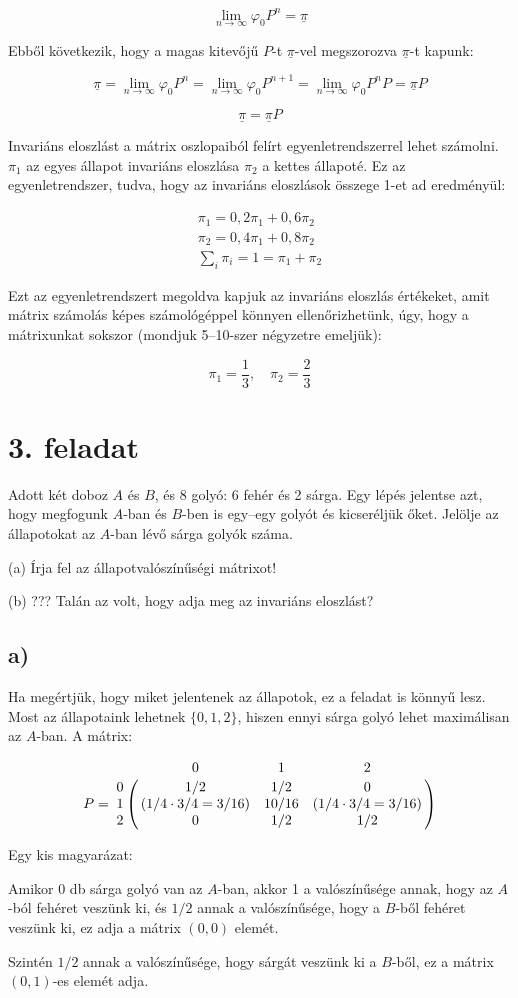 \documentclass[a4paper,12pt]{article}
\begin{document}
\[
\lim_{n\to \infty} \varphi_0 P^n = \underline{\pi}
\] 

Ebből következik, hogy a magas kitevőjű $P$-t $\underline{\pi}$-vel
megszorozva $\underline{\pi}$-t kapunk:

\[
\underline{\pi} = \lim_{n\to \infty} \varphi_0 P^n = 
\lim_{n\to \infty} \varphi_0 P^{n+1} = 
\lim_{n\to \infty} \varphi_0 P^n P = \underline{\pi} P
\]

\[
\underline{\pi} = \underline{\pi} P
\]

Invariáns eloszlást a mátrix oszlopaiból felírt
egyenletrendszerrel lehet számolni. $\pi_1$ az egyes állapot invariáns
eloszlása $\pi_2$ a kettes állapoté. Ez az egyenletrendszer, tudva, hogy 
az invariáns eloszlások összege 1-et ad eredményül:


\begin{eqnarray*}
\pi_1 = 0,2 \pi_1 + 0,6 \pi_2 \\
\pi_2 = 0,4 \pi_1 + 0,8 \pi_2 \\
\sum_i \pi_i = 1 = \pi_1 + \pi_2
\end{eqnarray*}

Ezt az egyenletrendszert megoldva kapjuk az invariáns eloszlás 
értékeket, amit mátrix számolás képes számológéppel könnyen
ellenőrizhetünk, úgy, hogy a mátrixunkat sokszor 
(mondjuk 5--10-szer négyzetre emeljük):

\[
\pi_1 = \frac{1}{3},\quad \pi_2 = \frac{2}{3}
\]

\section*{3. feladat}
Adott két doboz $A$ és $B$, és 8 golyó: 6 fehér és 2 sárga. Egy lépés
jelentse azt, hogy megfogunk $A$-ban és $B$-ben is egy--egy golyót és
kicseréljük őket. Jelölje az állapotokat az $A$-ban lévő sárga golyók
száma.

(a) Írja fel az állapotvalószínűségi mátrixot!

(b) ??? Talán az volt, hogy adja meg az invariáns eloszlást?

\subsection*{a)}
Ha megértjük, hogy miket jelentenek az állapotok, ez a feladat is
könnyű lesz. Most az állapotaink lehetnek $\{0, 1, 2\}$, hiszen
ennyi sárga golyó lehet maximálisan az $A$-ban. A mátrix:

\[
P = 
\bordermatrix{
~	&	0    &    1      &	    2	\cr
0	&	1/2  &    1/2    &	    0	\cr
1	
&	(1/4 \cdot 3/4 = 3/16)
&	10/16
&   (1/4 \cdot 3/4 = 3/16)   \cr
2	&	0    &    1/2    &      1/2}
\]

Egy kis magyarázat: 
\itemize
\item Amikor 0 db sárga golyó van az $A$-ban, akkor
1 a valószínűsége annak, hogy az $A$-ból fehéret veszünk ki, és
$1/2$ annak a valószínűsége, hogy a $B$-ből fehéret veszünk ki, 
ez adja a mátrix $(0, 0)$ elemét. 
\item Szintén $1/2$ annak a valószínűsége,
hogy sárgát veszünk ki a $B$-ből, ez a mátrix $(0, 1)$-es elemét adja.
\end{document}
